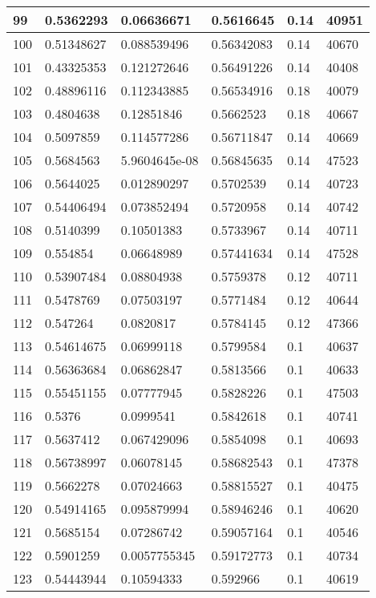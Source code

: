 \begin{longtable}{|l|l|l|l|l|l|}
99 & 0.5362293 & 0.06636671 & 0.5616645 & 0.14 & 40951 \\ \hline 
100 & 0.51348627 & 0.088539496 & 0.56342083 & 0.14 & 40670 \\ \hline 
101 & 0.43325353 & 0.121272646 & 0.56491226 & 0.14 & 40408 \\ \hline 
102 & 0.48896116 & 0.112343885 & 0.56534916 & 0.18 & 40079 \\ \hline 
103 & 0.4804638 & 0.12851846 & 0.5662523 & 0.18 & 40667 \\ \hline 
104 & 0.5097859 & 0.114577286 & 0.56711847 & 0.14 & 40669 \\ \hline 
105 & 0.5684563 & 5.9604645e-08 & 0.56845635 & 0.14 & 47523 \\ \hline 
106 & 0.5644025 & 0.012890297 & 0.5702539 & 0.14 & 40723 \\ \hline 
107 & 0.54406494 & 0.073852494 & 0.5720958 & 0.14 & 40742 \\ \hline 
108 & 0.5140399 & 0.10501383 & 0.5733967 & 0.14 & 40711 \\ \hline 
109 & 0.554854 & 0.06648989 & 0.57441634 & 0.14 & 47528 \\ \hline 
110 & 0.53907484 & 0.08804938 & 0.5759378 & 0.12 & 40711 \\ \hline 
111 & 0.5478769 & 0.07503197 & 0.5771484 & 0.12 & 40644 \\ \hline 
112 & 0.547264 & 0.0820817 & 0.5784145 & 0.12 & 47366 \\ \hline 
113 & 0.54614675 & 0.06999118 & 0.5799584 & 0.1 & 40637 \\ \hline 
114 & 0.56363684 & 0.06862847 & 0.5813566 & 0.1 & 40633 \\ \hline 
115 & 0.55451155 & 0.07777945 & 0.5828226 & 0.1 & 47503 \\ \hline 
116 & 0.5376 & 0.0999541 & 0.5842618 & 0.1 & 40741 \\ \hline 
117 & 0.5637412 & 0.067429096 & 0.5854098 & 0.1 & 40693 \\ \hline 
118 & 0.56738997 & 0.06078145 & 0.58682543 & 0.1 & 47378 \\ \hline 
119 & 0.5662278 & 0.07024663 & 0.58815527 & 0.1 & 40475 \\ \hline 
120 & 0.54914165 & 0.095879994 & 0.58946246 & 0.1 & 40620 \\ \hline 
121 & 0.5685154 & 0.07286742 & 0.59057164 & 0.1 & 40546 \\ \hline 
122 & 0.5901259 & 0.0057755345 & 0.59172773 & 0.1 & 40734 \\ \hline 
123 & 0.54443944 & 0.10594333 & 0.592966 & 0.1 & 40619 \\ \hline 

\end{longtable}
